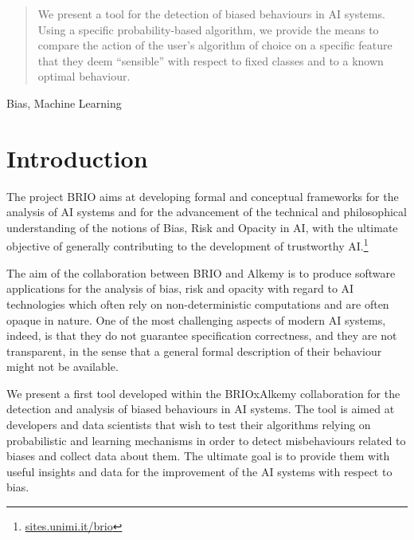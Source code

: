 \documentclass[
]{ceurart}
\begin{document}
\begin{abstract}
We present a tool for the detection of biased behaviours in AI systems. Using a specific probability-based algorithm,
we provide the means to compare the action of the user's algorithm of choice on a specific feature that they deem ``sensible'' with respect to fixed classes and to a known optimal behaviour.
\end{abstract}

\begin{keywords}
Bias, Machine Learning
\end{keywords}

\maketitle

\section{Introduction}
\label{sec:intro}


The project BRIO aims at developing formal and conceptual frameworks for the analysis of AI systems and for the advancement of the technical and philosophical understanding of the notions of Bias, Risk and Opacity in AI, with the ultimate objective of generally contributing to the development of trustworthy AI.\footnote{\url{sites.unimi.it/brio}} 

The aim of the collaboration between BRIO and Alkemy is to produce software applications for the analysis of bias, risk and opacity with regard to AI technologies which often rely on non-deterministic computations and  are often opaque in nature. One of the most challenging aspects of modern AI systems, indeed, is that they do not guarantee specification correctness, and they are not transparent, in the sense that a general formal description of their behaviour might not be available.

We present a first tool developed within the BRIOxAlkemy collaboration for the detection and analysis of biased behaviours in AI systems. The tool is aimed at developers and data scientists that wish to test their algorithms relying on probabilistic and learning mechanisms in order to detect misbehaviours related to biases and collect data about them. The ultimate goal is to provide them with useful insights and data for the improvement of the AI systems with respect to bias.
\end{document}
